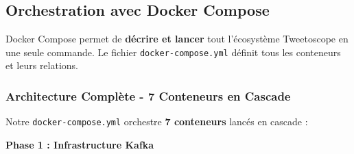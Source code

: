 \documentclass[10pt,a4paper]{article}
\begin{document}
\subsection{Orchestration avec Docker Compose}

Docker Compose permet de \textbf{décrire et lancer} tout l'écosystème Tweetoscope en une seule commande. Le fichier \texttt{docker-compose.yml} définit tous les conteneurs et leurs relations.

\subsubsection{Architecture Complète - 7 Conteneurs en Cascade}

Notre \texttt{docker-compose.yml} orchestre \textbf{7 conteneurs} lancés en cascade :

\textbf{Phase 1 : Infrastructure Kafka}
\end{document}

